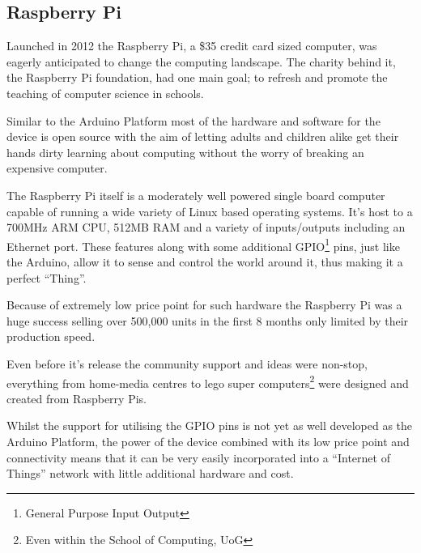\documentclass{l4proj}
\begin{document}
\newpage
\subsection{Raspberry Pi} %
\label{sub:raspberry_pi}
Launched in 2012 the Raspberry Pi, a \$35 credit card sized computer, was eagerly anticipated to change the computing landscape. The charity behind it, the Raspberry Pi foundation, had one main goal; to refresh and promote the teaching of computer science in schools.

Similar to the Arduino Platform most of the hardware and software for the device is open source with the aim of letting adults and children alike get their hands dirty learning about computing without the worry of breaking an expensive computer.

The Raspberry Pi itself is a moderately well powered single board computer capable of running a wide variety of Linux based operating systems. It's host to a 700MHz ARM CPU, 512MB RAM and a variety of inputs/outputs including an Ethernet port. These features along with some additional GPIO\footnote{General Purpose Input Output} pins, just like the Arduino, allow it to sense and control the world around it, thus making it a perfect ``Thing''.

Because of extremely low price point for such hardware the Raspberry Pi was a huge success selling over 500,000 units in the first 8 months only limited by their production speed.\cite{RaspberryPiSold}

Even before it's release the community support and ideas were non-stop, everything from home-media centres\cite{Raspbmc} to lego super computers\footnote{Even within the School of Computing, UoG}\cite{LegoSuperComputer} were designed and created from Raspberry Pis.

Whilst the support for utilising the GPIO pins is not yet as well developed as the Arduino Platform, the power of the device combined with its low price point and connectivity means that it can be very easily incorporated into a ``Internet of Things'' network with little additional hardware and cost.


\begin{comment}
new, more powerful open device. runs a real operating system with gpio options
perhaps upper limit of power for this protocol
most languages possible, threading etc
\end{comment}
\end{document}
